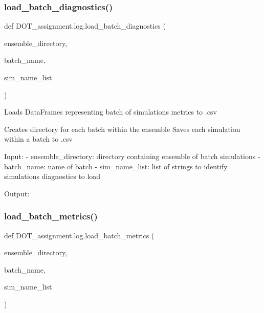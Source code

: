 \subsubsection{\texorpdfstring{load\_batch\_diagnostics()}{load\_batch\_diagnostics()}}
{\footnotesize\ttfamily def D\+O\+T\+\_\+assignment.\+log.\+load\+\_\+batch\+\_\+diagnostics (\begin{DoxyParamCaption}\item[{}]{ensemble\+\_\+directory,  }\item[{}]{batch\+\_\+name,  }\item[{}]{sim\+\_\+name\+\_\+list }\end{DoxyParamCaption})}

\begin{DoxyVerb}Loads DataFrames representing batch of simulations metrics to .csv

Creates directory for each batch within the ensemble
Saves each simulation within a batch to .csv

Input:
- ensemble_directory:           directory containing ensemble of batch simulations
- batch_name:                   name of batch
- sim_name_list:                list of strings to identify simulations diagnostics to load

Output:\end{DoxyVerb}
 \mbox{\label{namespace_d_o_t__assignment_1_1log_a8d9bed4ad94f6b0b8126c8c0305603dc}} 
\subsubsection{\texorpdfstring{load\_batch\_metrics()}{load\_batch\_metrics()}}
{\footnotesize\ttfamily def D\+O\+T\+\_\+assignment.\+log.\+load\+\_\+batch\+\_\+metrics (\begin{DoxyParamCaption}\item[{}]{ensemble\+\_\+directory,  }\item[{}]{batch\+\_\+name,  }\item[{}]{sim\+\_\+name\+\_\+list }\end{DoxyParamCaption})}

